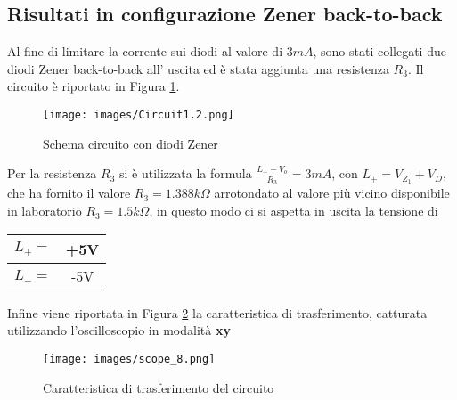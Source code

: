 \subsection{Risultati in configurazione Zener back-to-back}
 Al fine di limitare la corrente sui diodi al valore di $3mA$, sono stati collegati due diodi Zener back-to-back all' uscita ed è stata aggiunta una resistenza $R_3$. Il circuito è riportato in Figura \ref{fig:Circuit1.2}. 
\begin{figure}[H]
    \centering
    \texttt{[image: images/Circuit1.2.png]}
    \caption{Schema circuito con diodi Zener}
    \label{fig:Circuit1.2}
\end{figure}
Per la resistenza $R_3$ si è utilizzata la formula $\frac{L_+-V_o}{R_3}=3mA$, con $L_+=V_{Z_1}+V_D$, che ha fornito il valore $R_3=1.388k\Omega$ arrotondato al valore più vicino disponibile in laboratorio $R_3=1.5k\Omega$, in questo modo ci si aspetta in uscita la tensione di

\begin{table}[H]
    \centering 
    \begin{tabular}{|c|c|}
        \hline
        $L_+=$&+5V \\\hline
        $L_-=$&-5V \\\hline
    \end{tabular}
\end{table}
Infine viene riportata in Figura \ref{fig:TrasfXY1.1} la caratteristica di trasferimento, catturata utilizzando l’oscilloscopio in modalità \textbf{xy} 
\begin{figure}[H]
    \centering
    \texttt{[image: images/scope\_8.png]} 
    \caption{Caratteristica di trasferimento del circuito}
    \label{fig:TrasfXY1.1}
\end{figure}